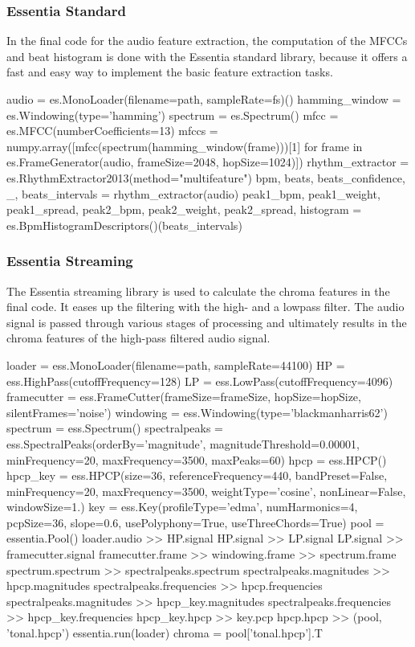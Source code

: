 \subsubsection{Essentia Standard}

In the final code for the audio feature extraction, the computation of the MFCCs and beat histogram is done with the Essentia standard library, because it offers a fast and easy way to implement the basic feature extraction tasks. 
\begin{pythonCode}[frame=single,label={lst:esss},caption={Essentia standard},captionpos=b]
audio = es.MonoLoader(filename=path, sampleRate=fs)()
hamming_window = es.Windowing(type='hamming')
spectrum = es.Spectrum()
mfcc = es.MFCC(numberCoefficients=13)
mfccs = numpy.array([mfcc(spectrum(hamming_window(frame)))[1] 
	for frame in es.FrameGenerator(audio, frameSize=2048, hopSize=1024)])
rhythm_extractor = es.RhythmExtractor2013(method="multifeature")
bpm, beats, beats_confidence, _, beats_intervals = rhythm_extractor(audio)
peak1_bpm, peak1_weight, peak1_spread, peak2_bpm, peak2_weight, peak2_spread, histogram =
	es.BpmHistogramDescriptors()(beats_intervals)
\end{pythonCode}

\subsubsection{Essentia Streaming}

The Essentia streaming library is used to calculate the chroma features in the final code. It eases up the filtering with the high- and a lowpass filter. The audio signal is passed through various stages of processing and ultimately results in the chroma features of the high-pass filtered audio signal. 
\begin{pythonCode}[frame=single,label={lst:essst},caption={Essentia streaming},captionpos=b]
loader = ess.MonoLoader(filename=path, sampleRate=44100)
HP = ess.HighPass(cutoffFrequency=128)
LP = ess.LowPass(cutoffFrequency=4096)
framecutter = ess.FrameCutter(frameSize=frameSize, hopSize=hopSize, 
	silentFrames='noise')
windowing = ess.Windowing(type='blackmanharris62')
spectrum = ess.Spectrum()
spectralpeaks = ess.SpectralPeaks(orderBy='magnitude', magnitudeThreshold=0.00001, 
	minFrequency=20, maxFrequency=3500, maxPeaks=60)
hpcp = ess.HPCP()
hpcp_key = ess.HPCP(size=36, referenceFrequency=440, bandPreset=False, minFrequency=20,
	maxFrequency=3500, weightType='cosine', nonLinear=False, windowSize=1.)
key = ess.Key(profileType='edma', numHarmonics=4, pcpSize=36, slope=0.6, 
	usePolyphony=True, useThreeChords=True)
pool = essentia.Pool()
loader.audio >> HP.signal
HP.signal >> LP.signal
LP.signal >> framecutter.signal    
framecutter.frame >> windowing.frame >> spectrum.frame
spectrum.spectrum >> spectralpeaks.spectrum
spectralpeaks.magnitudes >> hpcp.magnitudes
spectralpeaks.frequencies >> hpcp.frequencies
spectralpeaks.magnitudes >> hpcp_key.magnitudes
spectralpeaks.frequencies >> hpcp_key.frequencies
hpcp_key.hpcp >> key.pcp
hpcp.hpcp >> (pool, 'tonal.hpcp')
essentia.run(loader)
chroma = pool['tonal.hpcp'].T
\end{pythonCode}	

